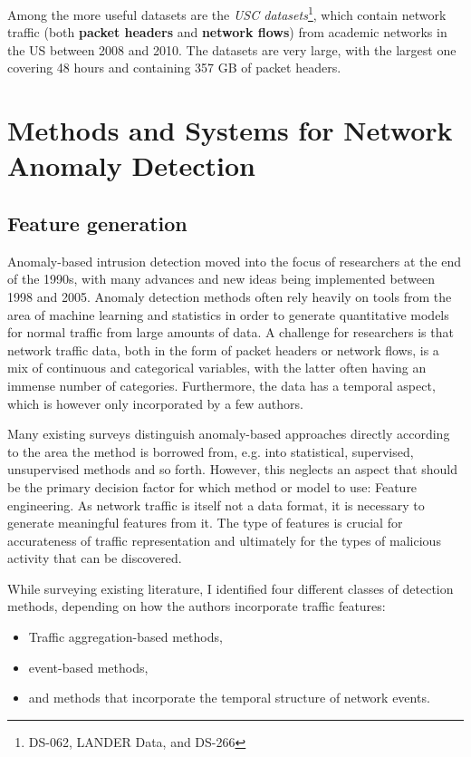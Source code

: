 \documentclass[a4paper,12pt,twoside]{report}
\begin{document}
Among the more useful datasets are the \textit{USC datasets}\footnote{DS-062, LANDER Data, and DS-266}, which contain network traffic (both \textbf{packet headers} and \textbf{network flows}) from academic networks in the US between 2008 and 2010. The datasets are very large, with the largest one covering 48 hours and containing 357 GB of packet headers. 


\chapter{Methods and Systems for Network Anomaly Detection}\label{Anomaly detection}

\section{Feature generation}

Anomaly-based intrusion detection moved into the focus of researchers at the end of the 1990s, with many advances and new ideas being implemented between 1998 and 2005. Anomaly detection methods often rely heavily on tools from the area of machine learning and statistics in order to generate quantitative models for normal traffic from large amounts of data. A challenge for researchers is that network traffic data, both in the form of packet headers or network flows, is a mix of continuous and categorical variables, with the latter often having an immense number of categories. Furthermore, the data has a temporal aspect, which is however only incorporated by a few authors. 

Many existing surveys \cite{ahmed2016survey,buczak_survey_2016,bhuyan_network_2014} distinguish anomaly-based approaches directly according to the area the method is borrowed from, e.g. into statistical, supervised, unsupervised methods and so forth. 
However, this neglects an aspect that should be the primary decision factor for which method or model to use: Feature engineering. As network traffic is itself not a data format, it is necessary to generate meaningful features from it. The type of features is crucial for accurateness of traffic representation and ultimately for the types of malicious activity that can be discovered. 


While surveying existing literature, I identified four different classes of detection methods, depending on how the authors incorporate traffic features: 

\begin{itemize}
\item Traffic aggregation-based methods,
\item event-based methods,
\item and methods that incorporate the temporal structure of network events.
\end{itemize}
\end{document}
